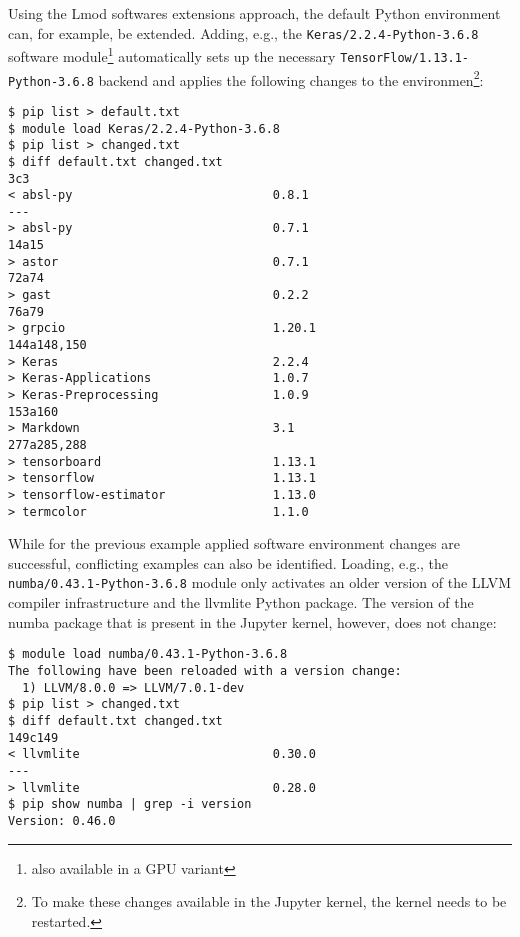 Using the Lmod softwares extensions approach, the default Python environment can, for example, be extended.
Adding, e.g., the \verb|Keras/2.2.4-Python-3.6.8| software module\footnote{also available in a GPU variant} automatically sets up the necessary \verb|TensorFlow/1.13.1-Python-3.6.8| backend and applies the following changes to the environmen\footnote{To make these changes available in the Jupyter kernel, the kernel needs to be restarted.}:
%
\begin{verbatim}
$ pip list > default.txt
$ module load Keras/2.2.4-Python-3.6.8
$ pip list > changed.txt
$ diff default.txt changed.txt
3c3
< absl-py                            0.8.1
---
> absl-py                            0.7.1
14a15
> astor                              0.7.1
72a74
> gast                               0.2.2
76a79
> grpcio                             1.20.1
144a148,150
> Keras                              2.2.4
> Keras-Applications                 1.0.7
> Keras-Preprocessing                1.0.9
153a160
> Markdown                           3.1
277a285,288
> tensorboard                        1.13.1
> tensorflow                         1.13.1
> tensorflow-estimator               1.13.0
> termcolor                          1.1.0
\end{verbatim}

While for the previous example applied software environment changes are successful, conflicting examples can also be identified.
Loading, e.g., the \verb|numba/0.43.1-Python-3.6.8| module only activates an older version of the LLVM compiler infrastructure and the llvmlite Python package. The version of the numba package that is present in the Jupyter kernel, however, does not change:
%
\begin{verbatim}
$ module load numba/0.43.1-Python-3.6.8
The following have been reloaded with a version change:
  1) LLVM/8.0.0 => LLVM/7.0.1-dev
$ pip list > changed.txt
$ diff default.txt changed.txt
149c149
< llvmlite                           0.30.0
---
> llvmlite                           0.28.0
$ pip show numba | grep -i version
Version: 0.46.0
\end{verbatim}

